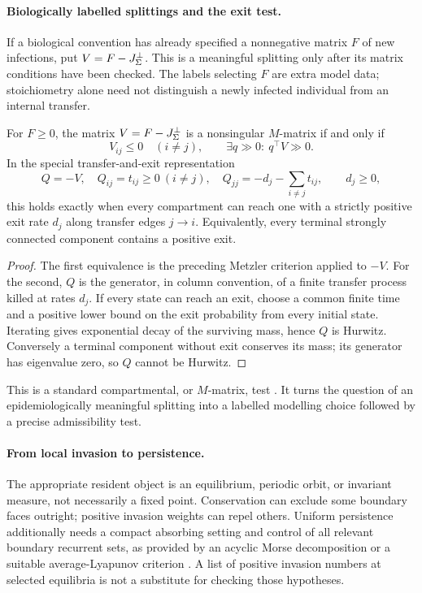 \paragraph{Biologically labelled splittings and the exit test.}
If a biological convention has already specified a nonnegative matrix
$F$ of new infections, put $V=F-J_{\Sigma}^\perp$. This is a meaningful
splitting only after its matrix conditions have been checked. The
labels selecting $F$ are extra model data; stoichiometry alone need
not distinguish a newly infected individual from an internal transfer.

\label{p:toolExit}
For $F\geq0$, the matrix $V=F-J_{\Sigma}^\perp$ is a nonsingular
$M$-matrix if and only if
\[
 V_{ij}\leq0\quad(i\ne j),\qquad
 \exists q\gg0:\ q^\top V\gg0.
\]
In the special transfer-and-exit representation
\[
 Q=-V,\quad Q_{ij}=t_{ij}\geq0\ (i\ne j),\quad
 Q_{jj}=-d_j-\sum_{i\ne j}t_{ij},\qquad d_j\geq0,
\]
this holds exactly when every compartment can reach one with a
strictly positive exit rate $d_j$ along transfer edges $j\to i$.
Equivalently, every terminal strongly connected component contains
a positive exit.
\eeT
\begin{proof}
The first equivalence is the preceding Metzler criterion applied to
$-V$. For the second, $Q$ is the generator, in column convention, of
a finite transfer process killed at rates $d_j$. If every state can
reach an exit, choose a common finite time and a positive lower bound
on the exit probability from every initial state. Iterating gives
exponential decay of the surviving mass, hence $Q$ is Hurwitz.
Conversely a terminal component without exit conserves its mass;
its generator has eigenvalue zero, so $Q$ cannot be Hurwitz.
\end{proof}
This is a standard compartmental, or $M$-matrix, test
\cite{Berman,Van}.
It turns the question of an epidemiologically meaningful splitting
into a labelled modelling choice followed by a precise admissibility
test.
\fi

\paragraph{From local invasion to persistence.}
The appropriate resident object is an equilibrium, periodic orbit, or
invariant measure, not necessarily a fixed point. Conservation can
exclude some boundary faces outright; positive invasion weights can
repel others. Uniform persistence additionally needs a compact
absorbing setting and control of all relevant boundary recurrent
sets, as provided by an acyclic Morse decomposition or a suitable
average-Lyapunov criterion \cite{FRT94,HS10,HofSch,SmithThieme2011}. A list of
positive invasion numbers at selected equilibria is not a substitute
for checking those hypotheses. 
